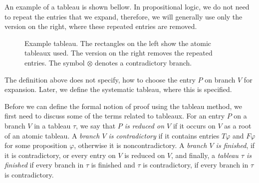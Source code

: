 An example of a tableau is shown bellow. In propositional logic, we do not need to repeat the entries that we expand, therefore, we will generally use only the version on the right, where these repeated entries are removed.

\begin{figure}[ht]
\begin{minipage}{0.5\textwidth}
\centering
{}
\end{minipage}
\begin{minipage}{0.5\textwidth}
\centering
{}
\end{minipage}
\caption{Example tableau. The rectangles on the left show the atomic tableaux used. The version on the right removes the repeated entries. The symbol $\otimes$ denotes a contradictory branch.}
\label{fig:tableau_notation_proof}
\end{figure}

The definition above does not specify, how to choose the entry $P$ on branch $V$ for expansion. Later, we define the systematic tableau, where this is specified.

Before we can define the formal notion of proof using the tableau method, we first need to discuss some of the terms related to tableaux. For an entry $P$ on a branch $V$ in a tableau $\tau$, we say that \emph{$P$ is reduced on $V$} if it occurs on $V$ as a root of an atomic tableau. A \emph{branch $V$ is contradictory} if it contains entries $T \varphi$ and $F \varphi$ for some proposition $\varphi$, otherwise it is noncontradictory. A \emph{branch $V$ is finished}, if it is contradictory, or every entry on $V$ is reduced on $V$, and finally, a \emph{tableau $\tau$ is finished} if every branch in $\tau$ is finished and $\tau$ is contradictory, if every branch in $\tau$ is contradictory.

